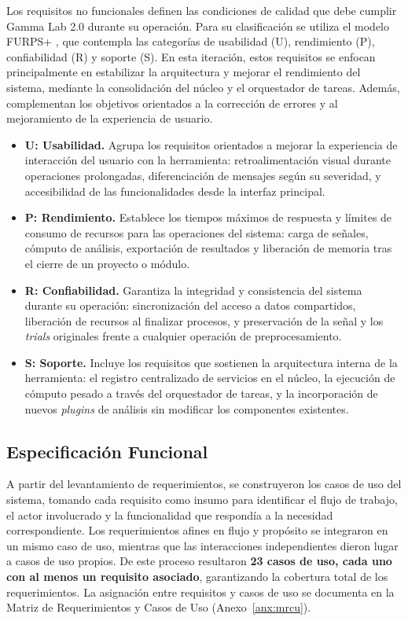 \documentclass[12pt,letterpaper,oneside]{article}
\begin{document}
Los requisitos no funcionales definen las condiciones de calidad que debe cumplir Gamma Lab 2.0 durante su operación. Para su clasificación se utiliza el modelo FURPS+ \cite{eeles2001}, que contempla las categorías de usabilidad (U), rendimiento (P), confiabilidad (R) y soporte (S). En esta iteración, estos requisitos se enfocan principalmente en estabilizar la arquitectura y mejorar el rendimiento del sistema, mediante la consolidación del núcleo y el orquestador de tareas. Además, complementan los objetivos orientados a la corrección de errores y al mejoramiento de la experiencia de usuario.

\begin{itemize}
    \item \textbf{U: Usabilidad.} Agrupa los requisitos orientados a mejorar la experiencia de interacción del usuario con la herramienta: retroalimentación visual durante operaciones prolongadas, diferenciación de mensajes según su severidad, y accesibilidad de las funcionalidades desde la interfaz principal.

    \item \textbf{P: Rendimiento.} Establece los tiempos máximos de respuesta y límites de consumo de recursos para las operaciones del sistema: carga de señales, cómputo de análisis, exportación de resultados y liberación de memoria tras el cierre de un proyecto o módulo.

    \item \textbf{R: Confiabilidad.} Garantiza la integridad y consistencia del sistema durante su operación: sincronización del acceso a datos compartidos, liberación de recursos al finalizar procesos, y preservación de la señal y los \textit{trials} originales frente a cualquier operación de preprocesamiento.

    \item \textbf{S: Soporte.} Incluye los requisitos que sostienen la arquitectura interna de la herramienta: el registro centralizado de servicios en el núcleo, la ejecución de cómputo pesado a través del orquestador de tareas, y la incorporación de nuevos \textit{plugins} de análisis sin modificar los componentes existentes.
\end{itemize}

\subsection{Especificación Funcional}

A partir del levantamiento de requerimientos, se construyeron los casos de uso del sistema, tomando cada requisito como insumo para identificar el flujo de trabajo, el actor involucrado y la funcionalidad que respondía a la necesidad correspondiente. Los requerimientos afines en flujo y propósito se integraron en un mismo caso de uso, mientras que las interacciones independientes dieron lugar a casos de uso propios. De este proceso resultaron \textbf{23 casos de uso, cada uno con al menos un requisito asociado}, garantizando la cobertura total de los requerimientos. La asignación entre requisitos y casos de uso se documenta en la Matriz de Requerimientos y Casos de Uso (Anexo~\ref{anx:mrcu}).
\end{document}

